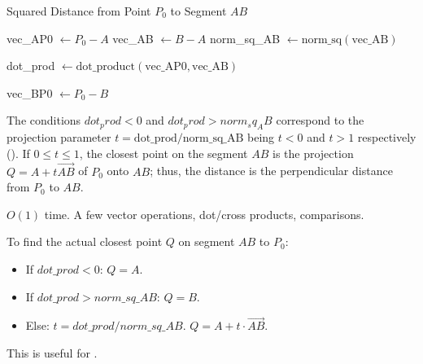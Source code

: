 \begin{algorithm}[H]
\caption{Squared Distance from Point $P_0$ to Segment $AB$}
\label{alg:A.2.2.dist_sq_point_segment}
vec\_AP0 $\leftarrow P_0 - A$\;
vec\_AB $\leftarrow B - A$\;
norm\_sq\_AB $\leftarrow \text{norm\_sq}(\text{vec\_AB})$\;

 {  } 

dot\_prod $\leftarrow \text{dot\_product}(\text{vec\_AP0}, \text{vec\_AB})$\;

 { 
     
}
 { 
    vec\_BP0 $\leftarrow P_0 - B$\;
     
}
\end{algorithm}
\begin{intuition}
\label{intuition:A.2.2.dist_sq_point_segment}
The conditions $dot_prod < 0$ and $dot_prod > norm_sq_AB$ correspond to the projection parameter $t = \text{dot\_prod} / \text{norm\_sq\_AB}$ being $t<0$ and $t>1$ respectively ().
If $0 \leq t \leq 1$, the closest point on the segment $AB$ is the projection $Q = A + t \vec{AB}$ of $P_0$ onto $AB$; thus, the distance is the perpendicular distance from $P_0$ to $AB$.
\end{intuition}
\begin{complexity}
\label{comp:A.2.2.dist_sq_point_segment}
$O(1)$ time. A few vector operations, dot/cross products, comparisons.
\end{complexity}
\begin{implementation}
\label{impl:A.2.2.dist_point_segment_closest_point}
To find the actual closest point $Q$ on segment $AB$ to $P_0$:
\begin{itemize}
    \item If $dot\_prod < 0$: $Q=A$.
    \item If $dot\_prod > norm\_sq\_AB$: $Q=B$.
    \item Else: $t = dot\_prod / norm\_sq\_AB$. $Q = A + t \cdot \vec{AB}$.
\end{itemize}
This is useful for .
\end{implementation}